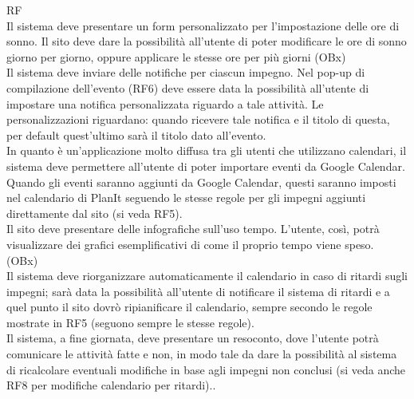 \begin {mylist} {RF}
     \\
    Il sistema deve presentare un form personalizzato per l'impostazione delle ore
    di sonno. Il sito deve dare la possibilità all'utente di poter modificare le ore 
    di sonno giorno per giorno, oppure applicare le stesse ore per più giorni (OBx)
     \\
    Il sistema deve inviare delle notifiche per ciascun impegno. Nel pop-up
    di compilazione dell'evento (RF6) deve essere data la possibilità all'utente
    di impostare una notifica personalizzata riguardo a tale attività.
    Le personalizzazioni riguardano: quando ricevere tale notifica e il titolo di questa, per 
    default quest'ultimo sarà il titolo dato all'evento.
     \\
    In quanto è un'applicazione molto diffusa tra gli utenti che utilizzano calendari,
    il sistema deve permettere all'utente di poter importare eventi da Google Calendar. 
    Quando gli eventi saranno aggiunti da Google Calendar, questi saranno
    imposti nel calendario di PlanIt seguendo le stesse regole per gli impegni 
    aggiunti direttamente dal sito (si veda RF5).
     \\
    Il sito deve presentare delle infografiche sull'uso tempo. L'utente, così, potrà
    visualizzare dei grafici esemplificativi di come il proprio tempo viene speso. 
    (OBx)
     \\
    Il sistema deve riorganizzare automaticamente il calendario in caso di ritardi sugli 
    impegni; sarà data la possibilità all'utente di notificare il sistema di ritardi e 
    a quel punto il sito dovrò ripianificare il calendario, sempre secondo le regole mostrate
    in RF5 (seguono sempre le stesse regole).  
     \\
    Il sistema, a fine giornata, deve presentare un resoconto, dove l'utente potrà
    comunicare le attività fatte e non, in modo tale da dare la possibilità al sistema di 
    ricalcolare eventuali modifiche in base agli impegni non conclusi (si veda
    anche RF8 per modifiche calendario per ritardi)..
    



\end{mylist}